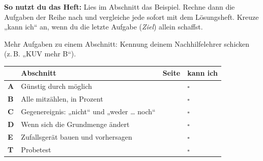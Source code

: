 \documentclass[11pt]{article}
\begin{document}
\par\smallskip
{}\par\medskip
\noindent\textbf{So nutzt du das Heft:} Lies im Abschnitt das Beispiel. Rechne dann die Aufgaben der Reihe nach und vergleiche jede sofort mit dem Lösungsheft. Kreuze „kann ich“ an, wenn du die letzte Aufgabe (\emph{Ziel}) allein schaffst.\par
\noindent Mehr Aufgaben zu einem Abschnitt: Kennung deinem Nachhilfelehrer schicken (z.\,B. „KUV mehr B“).\par\medskip
{\renewcommand{\arraystretch}{1.3}
\noindent\begin{tabular}{|>{\bfseries}p{10mm}|p{112mm}|>{\raggedleft\arraybackslash}p{10mm}|>{\centering\arraybackslash}p{14mm}|}\hline
\rowcolor{black!8} & \textbf{Abschnitt} & \textbf{Seite} & \textbf{kann ich}\\\hline
A & Günstig durch möglich & \pageref{s:A} & $\square$\\\hline
B & Alle mitzählen, in Prozent & \pageref{s:B} & $\square$\\\hline
C & Gegenereignis: „nicht“ und „weder … noch“ & \pageref{s:C} & $\square$\\\hline
D & Wenn sich die Grundmenge ändert & \pageref{s:D} & $\square$\\\hline
E & Zufallsgerät bauen und vorhersagen & \pageref{s:E} & $\square$\\\hline
T & Probetest & \pageref{s:T} & $\square$\\\hline
\end{tabular}}\par\bigskip
\end{document}
